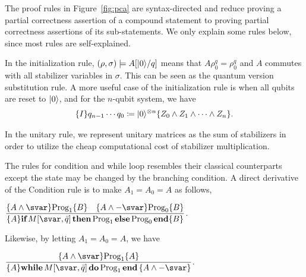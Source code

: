  
The proof rules in Figure~\ref{fig:pca} are syntax-directed and reduce proving a partial correctness assertion of a compound statement to proving partial correctness assertions of its sub-statements. We only explain some rules below, since most rules are self-explained.

In the initialization rule, $(\rho, \sigma)\models A[\vert 0 \rangle/q]$ means that $A\rho_0^q = \rho_0^q$ and $A$ commutes with all stabilizer variables in $\sigma$.  This can be seen as the quantum version substitution rule. 
A more useful case of the initialization rule is when all qubits are reset to $\vert 0 \rangle$, and for the $n$-qubit system, we have 
\begin{align}
    \{I\}q_{n-1}\cdots q_0\coloneqq \vert 0 \rangle^{\otimes n}\{Z_0\wedge Z_1\wedge \cdots \wedge Z_n\}.
\end{align}

In the unitary rule, we represent unitary matrices as the sum of stabilizers in order to utilize the cheap computational cost of stabilizer multiplication. 

The rules for condition and while loop resembles their classical counterparts except the state may be changed by the branching condition. A direct derivative of the Condition rule 
is to make $A_1 = A_0 = A$ as follows,
\begin{lemma}
$\dfrac{\{A \wedge \svar\}\prog_1\{B\}\quad \{A \wedge -\svar \}\prog_0\{B\}}{\{A\}\textbf{if}\,M[\svar, \bar{q}]\,\textbf{then}\, \prog_1\,\textbf{else}\, \prog_0\,\textbf{end}\{B\}}
$.\end{lemma}

Likewise, by letting $A_1 = A_0 = A$, we have%
\begin{lemma}
$\dfrac{\{ A \wedge \svar \}\prog_1\{A\} }{\{A\} \textbf{while}\, M[\svar, \bar{q}]\, \textbf{do}\, \prog_1\, \textbf{end}\,\{ A \wedge -\svar \} }$.
\end{lemma}


